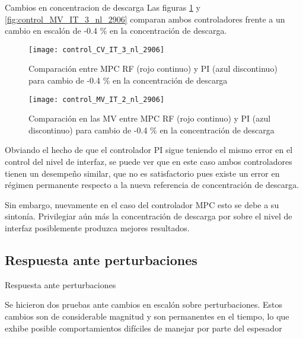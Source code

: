 \documentclass{beamer}
\begin{document}
\begin{myFrame}{Cambios en concentracion de descarga}
Las figuras \ref{fig:control_CV_IT_3_nl_2906} y \ref{fig:control_MV_IT_3_nl_2906} comparan ambos controladores frente a un cambio en escalón de -0.4 \% en la concentración de descarga.

\framebreak
\begin{figure}[H]
\centering
\texttt{[image: control\_CV\_IT\_3\_nl\_2906]}
\caption{Comparación entre MPC RF (rojo continuo) y PI (azul discontinuo) para cambio de -0.4 \% en la concentración de descarga}
\label{fig:control_CV_IT_3_nl_2906}
\end{figure}

\framebreak

\begin{figure}[H]
\centering
\texttt{[image: control\_MV\_IT\_2\_nl\_2906]}
\caption{Comparación en las MV entre MPC RF (rojo continuo) y PI (azul discontinuo) para cambio de -0.4 \% en la concentración de descarga}
\label{fig:control_MV_IT_2_nl_2906}
\end{figure}

\framebreak

Obviando el hecho de que el controlador PI sigue teniendo el mismo error en el control del nivel de interfaz, se puede ver que en este caso ambos controladores tienen un desempeño similar, que no es satisfactorio pues existe un error en régimen permanente respecto a la nueva referencia de concentración de descarga.

Sin embargo, nuevamente en el caso del controlador MPC esto se debe a su sintonía. Privilegiar aún más la concentración de descarga por sobre el nivel de interfaz posiblemente produzca mejores resultados.

\end{myFrame}

\subsection{Respuesta ante perturbaciones}
\begin{myFrame}{Respuesta ante perturbaciones}

Se hicieron dos pruebas ante cambios en escalón sobre perturbaciones. Estos cambios son de considerable magnitud y son permanentes en el tiempo, lo que exhibe posible comportamientos difíciles de manejar por parte del espesador

\end{myFrame}
\end{document}
